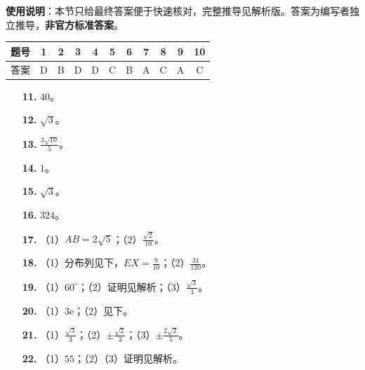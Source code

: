 
\begin{gknotice}
\textbf{使用说明}：本节只给最终答案便于快速核对，完整推导见解析版。答案为编写者独立推导，\textbf{非官方标准答案}。
\end{gknotice}

\begin{center}\begin{tabular}{ccccccccccc}
\toprule
题号 & 1 & 2 & 3 & 4 & 5 & 6 & 7 & 8 & 9 & 10 \\
\midrule
答案 & D & B & D & D & C & B & A & C & A & C \\
\bottomrule
\end{tabular}\end{center}

\begin{itemize}[leftmargin=2.6em]
  \item[\textbf{11.}] $40$。
  \item[\textbf{12.}] $\sqrt3$。
  \item[\textbf{13.}] $\frac{3\sqrt{10}}{5}$。
  \item[\textbf{14.}] $1$。
  \item[\textbf{15.}] $\sqrt3$。
  \item[\textbf{16.}] $324$。
\end{itemize}

\begin{itemize}[leftmargin=2.6em]
  \item[\textbf{17.}] （1）$AB=2\sqrt5$；（2）$\frac{\sqrt2}{10}$。
  \item[\textbf{18.}] （1）分布列见下，$EX=\frac9{10}$；（2）$\frac{31}{120}$。
  \item[\textbf{19.}] （1）$60^\circ$；（2）证明见解析；（3）$\frac{\sqrt3}{3}$。
  \item[\textbf{20.}] （1）$3\mathrm e$；（2）见下。
  \item[\textbf{21.}] （1）$\frac{\sqrt3}{3}$；（2）$\pm\frac{\sqrt2}{3}$；（3）$\pm\frac{2\sqrt2}{5}$。
  \item[\textbf{22.}] （1）$55$；（2）（3）证明见解析。
\end{itemize}
